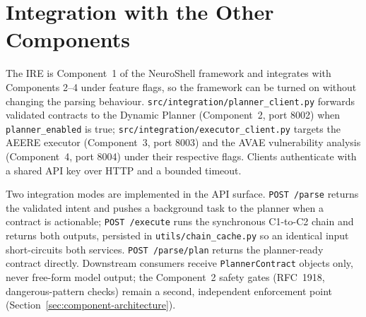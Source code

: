 \section{Integration with the Other Components}\label{sec:integration}

The IRE is Component~1 of the NeuroShell framework and integrates with
Components 2--4 under feature flags, so the framework can be turned on without
changing the parsing behaviour. \texttt{src/}\hspace{0pt}\texttt{integration/}\hspace{0pt}\texttt{planner\_client.py}
forwards validated contracts to the Dynamic Planner (Component~2, port 8002)
when \texttt{planner\_enabled} is true;
\texttt{src/}\hspace{0pt}\texttt{integration/}\hspace{0pt}\texttt{executor\_client.py}
targets the AEERE executor (Component~3, port 8003) and the AVAE vulnerability
analysis (Component~4, port 8004) under their respective flags. Clients
authenticate with a shared API key over HTTP and a bounded timeout.

Two integration modes are implemented in the API surface. \texttt{POST /parse}
returns the validated intent and pushes a background task to the planner when a
contract is actionable; \texttt{POST /execute} runs the synchronous C1-to-C2
chain and returns both outputs, persisted in
\texttt{utils/}\hspace{0pt}\texttt{chain\_cache.py} so
an identical input short-circuits both services. \texttt{POST /parse/plan}
returns the planner-ready contract directly. Downstream consumers receive
\texttt{PlannerContract} objects only, never free-form model output; the
Component~2 safety gates (RFC~1918, dangerous-pattern checks) remain a second,
independent enforcement point (Section~\ref{sec:component-architecture}).

